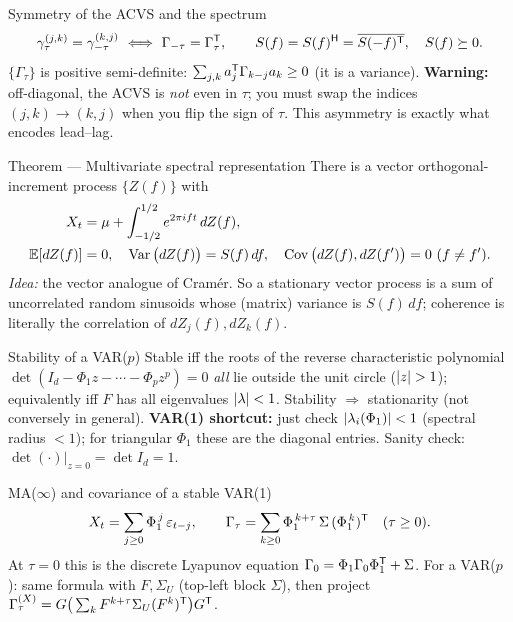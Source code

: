\documentclass[11pt]{article}
\begin{document}
\begin{result}{Symmetry of the ACVS and the spectrum}
\[
\acvs_\tau^{(j,k)}=\acvs_{-\tau}^{(k,j)}\ \Longleftrightarrow\ \Gamma_{-\tau}=\Gamma_\tau\Tr,
\qquad S(f)=S(f)\Herm=\conj{S(-f)\Tr},\quad S(f)\succeq0 .
\]
$\{\Gamma_\tau\}$ is positive semi-definite: $\sum_{j,k}a_j^{\mathsf{T}}\Gamma_{k-j}a_k\ge0$ (it is a variance). \textbf{Warning:} off-diagonal, the ACVS is \emph{not} even in $\tau$; you must swap the indices $(j,k)\!\to\!(k,j)$ when you flip the sign of $\tau$. This asymmetry is exactly what encodes lead--lag.
\end{result}

\begin{result}{Theorem --- Multivariate spectral representation}
There is a vector orthogonal-increment process $\{Z(f)\}$ with
\[
\begin{aligned}
X_t&=\mu+\int_{-1/2}^{1/2}e^{2\pi ift}\,dZ(f),\\
\mathbb{E}[dZ(f)]&=0,\quad \operatorname{Var}\big(dZ(f)\big)=S(f)\,df,\quad \operatorname{Cov}\big(dZ(f),dZ(f')\big)=0\ (f\ne f').
\end{aligned}
\]
\emph{Idea:} the vector analogue of Cram\'er. So a stationary vector process is a sum of uncorrelated random sinusoids whose (matrix) variance is $S(f)\,df$; coherence is literally the correlation of $dZ_j(f),dZ_k(f)$.
\end{result}

\begin{result}{Stability of a VAR($p$)}
Stable iff the roots of the reverse characteristic polynomial $\det(I_d-\Phi_1 z-\cdots-\Phi_p z^p)=0$ \emph{all} lie outside the unit circle ($\left\lvert z \right\rvert>1$); equivalently iff $F$ has all eigenvalues $\left\lvert \lambda \right\rvert<1$. Stability $\Rightarrow$ stationarity (not conversely in general). \textbf{VAR(1) shortcut:} just check $\left\lvert \lambda_i(\Phi_1) \right\rvert<1$ (spectral radius $<1$); for triangular $\Phi_1$ these are the diagonal entries. Sanity check: $\det(\cdot)\big|_{z=0}=\det I_d=1$.
\end{result}

\begin{result}{MA($\infty$) and covariance of a stable VAR(1)}
\[
X_t=\sum_{j\ge0}\Phi_1^{\,j}\,\varepsilon_{t-j},\qquad
\Gamma_\tau=\sum_{k\ge0}\Phi_1^{\,k+\tau}\,\Sigma\,(\Phi_1^{\,k})^{\mathsf{T}}\quad(\tau\ge0).
\]
At $\tau=0$ this is the discrete Lyapunov equation $\Gamma_0=\Phi_1\Gamma_0\Phi_1^{\mathsf{T}}+\Sigma$. For a VAR($p$): same formula with $F,\Sigma_U$ (top-left block $\Sigma$), then project $\Gamma_\tau^{(X)}=G\big(\sum_k F^{k+\tau}\Sigma_U(F^k)^{\mathsf{T}}\big)G^{\mathsf{T}}$.
\end{result}
\end{document}
